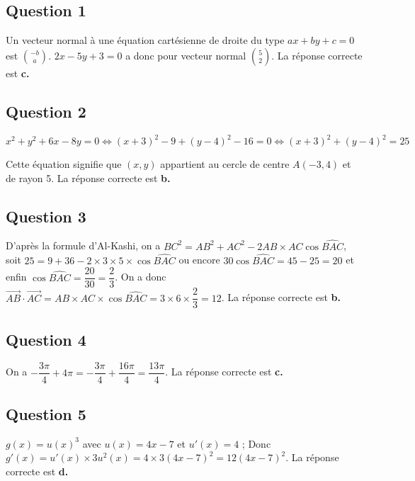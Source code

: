 \subsection*{Question 1}
	
	Un vecteur normal à une équation cartésienne de droite du type $ax+by+c=0$ est $\displaystyle\binom{-b}{a}$.
	$2x - 5y + 3 = 0$ a donc pour vecteur normal $\displaystyle\binom{5}{2}$.
	La réponse correcte est \textbf{c.}
	
	\subsection*{Question 2}
	
	\[
	x^2 + y^2 + 6x - 8y = 0 \iff (x + 3)^2 - 9 + (y - 4)^2 - 16 = 0 \iff (x + 3)^2 + (y - 4)^2 = 25
	\]
	
	\noindent Cette équation signifie que $(x, y)$ appartient au cercle de centre $A(-3, 4)$ et de rayon 5. La réponse correcte est \textbf{b.}
	
	\subsection*{Question 3}
	
	D'après la formule d'Al-Kashi, on a $BC^2 = AB^2 + AC^2 - 2AB \times AC \cos \widehat{BAC}$,
	soit $25 = 9 + 36 - 2 \times 3 \times 5 \times \cos \widehat{BAC}$
	ou encore $30 \cos \widehat{BAC} = 45 - 25 = 20$
	et enfin $\cos \widehat{BAC} = \dfrac{20}{30} = \dfrac{2}{3}$.
	On a donc $\overrightarrow{AB} \cdot \overrightarrow{AC} = AB \times AC \times \cos \widehat{BAC} = 3 \times 6 \times \dfrac{2}{3} = 12$. La réponse correcte est \textbf{b.}
	
	\subsection*{Question 4}
	
	On a $-\dfrac{3\pi}{4} + 4\pi = -\dfrac{3\pi}{4} + \dfrac{16\pi}{4} = \dfrac{13\pi}{4}$. La réponse correcte est \textbf{c.}
	
	\subsection*{Question 5}
	
	$g(x)=u(x)^3$ avec $u(x) = 4x - 7$ et $u'(x) = 4$ ;
	Donc $g'(x) = u'(x) \times 3u^2(x) = 4 \times 3(4x - 7)^2 = 12(4x - 7)^2$. La réponse correcte est \textbf{d.}
